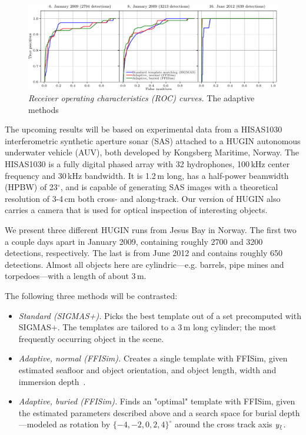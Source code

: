 \begin{figure}[t]\centering%
\includegraphics[width=\linewidth]{gfx/fig_rocs.pdf}%
\caption{\emph{Receiver operating characteristics (ROC) curves.} The adaptive methods }\label{IV_fig_roc_curves}%
\end{figure}

The upcoming results will be based on experimental data from a HISAS1030 interferometric synthetic aperture sonar (SAS) attached to a HUGIN autonomous underwater vehicle (AUV), both developed by Kongsberg Maritime, Norway. The HISAS1030 is a fully digital phased array with 32 hydrophones, 100\,kHz center frequency and 30\,kHz bandwidth. It is 1.2\,m long, has a half-power beamwidth (HPBW) of 23$^\circ$, and is capable of generating SAS images with a theoretical resolution of 3-4\,cm both cross- and along-track. Our version of HUGIN also carries a camera that is used for optical inspection of interesting objects.


We present three different HUGIN runs from Jesus Bay in Norway. The first two a couple days apart in January 2009, containing roughly 2700 and 3200 detections, respectively. The last is from June 2012 and contains roughly 650 detections. Almost all objects here are cylindric---e.g. barrels, pipe mines and torpedoes---with a length of about 3\,m.

The following three methods will be contrasted:
%
\begin{itemize}
\item \emph{Standard (SIGMAS+).} Picks the best template out of a set precomputed with SIGMAS+. The templates are tailored to a 3\,m long cylinder; the most frequently occurring object in the scene.
\item \emph{Adaptive, normal (FFISim).} Creates a single template with FFISim, given estimated seafloor and object orientation, and object length, width and immersion depth~\cite{Midelfart2010}. 
\item \emph{Adaptive, buried (FFISim).} Finds an "optimal" template with FFISim, given the estimated parameters described above and a search space for burial depth---modeled as rotation by $\{-4,-2,0,2,4\}^\circ$ around the cross track axis $y_\textrm{\tiny$\uvec{I}$}$.
\end{itemize}

